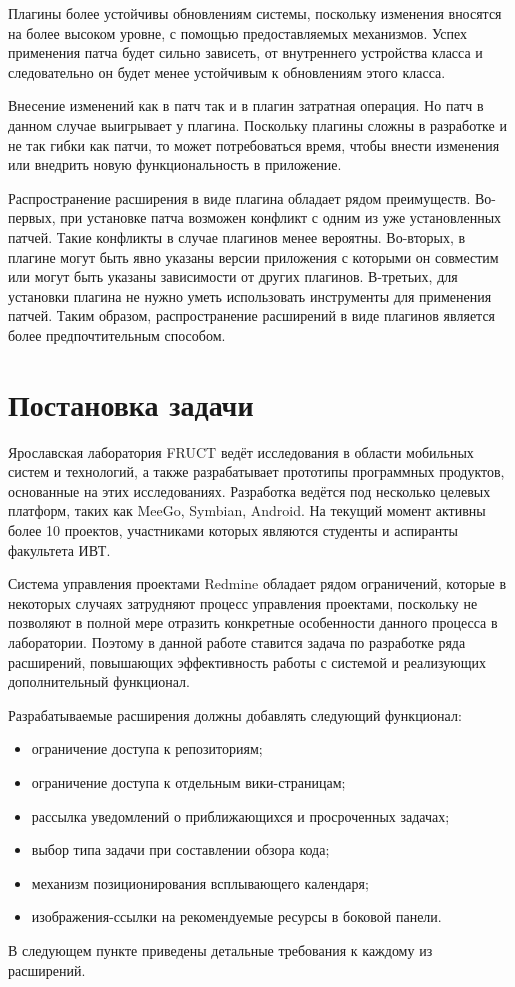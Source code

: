 Плагины более устойчивы обновлениям системы, поскольку изменения вносятся на
более высоком уровне, с помощью предоставляемых механизмов. Успех применения
патча будет сильно зависеть, от внутреннего устройства класса и следовательно
он будет менее устойчивым к обновлениям этого класса.

Внесение изменений как в патч так и в плагин затратная операция. Но патч в
данном случае выигрывает у плагина. Поскольку плагины сложны в разработке и не
так гибки как патчи, то может потребоваться время, чтобы внести изменения или
внедрить новую функциональность в приложение.

Распространение расширения в виде плагина обладает рядом преимуществ.
Во-первых, при установке патча возможен конфликт с одним из уже установленных
патчей. Такие конфликты в случае плагинов менее вероятны. Во-вторых, в плагине
могут быть явно указаны версии приложения с которыми он совместим или могут
быть указаны зависимости от других плагинов. В-третьих, для установки плагина
не нужно уметь использовать инструменты для применения патчей. Таким образом,
распространение расширений в виде плагинов является более предпочтительным
способом.

\section{Постановка задачи}

Ярославская лаборатория FRUCT \cite{yarfruct} ведёт исследования в области
мобильных систем и технологий, а также разрабатывает прототипы программных
продуктов, основанные на этих исследованиях. Разработка ведётся под несколько
целевых платформ, таких как MeeGo, Symbian, Android. На текущий момент активны
более 10 проектов, участниками которых являются студенты и аспиранты факультета
ИВТ.

Система управления проектами Redmine обладает рядом ограничений, которые в
некоторых случаях затрудняют процесс управления проектами, поскольку не
позволяют в полной мере отразить конкретные особенности данного процесса в
лаборатории. Поэтому в данной работе ставится задача по разработке ряда
расширений, повышающих эффективность работы с системой и реализующих
дополнительный функционал.

Разрабатываемые расширения должны добавлять следующий функционал:
\begin{itemize}
  \item ограничение доступа к репозиториям;
  \item ограничение доступа к отдельным вики-страницам;
  \item рассылка уведомлений о приближающихся и просроченных задачах; 
  \item выбор типа задачи при составлении обзора кода;
  \item механизм позиционирования всплывающего календаря;
  \item изображения-ссылки на рекомендуемые ресурсы в боковой панели.
\end{itemize}
В следующем пункте приведены детальные требования к каждому из расширений.

